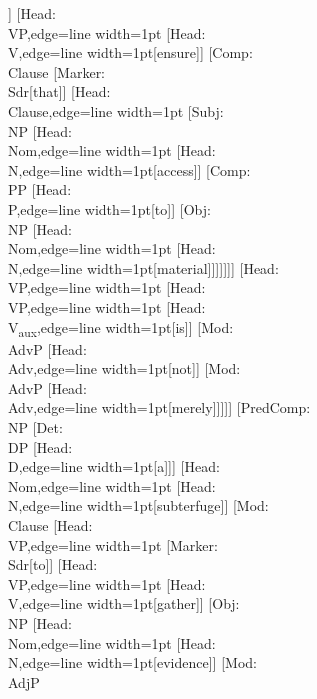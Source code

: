\documentclass[tikz,border=12pt]{standalone}
\newcommand{\Node}[2]{\small\textsf{#1:}\\{#2}}
\begin{document}
\begin{forest}
                    [\Node{Marker}{Sdr}[to]]
                    [\Node{Head}{VP},edge={line width=1pt}
                        [\Node{Head}{V},edge={line width=1pt}[ensure]]
                        [\Node{Comp}{Clause}
                            [\Node{Marker}{Sdr}[that]]
                            [\Node{Head}{Clause},edge={line width=1pt}
                                [\Node{Subj}{NP}
                                    [\Node{Head}{Nom},edge={line width=1pt}
                                        [\Node{Head}{N},edge={line width=1pt}[access]]
                                        [\Node{Comp}{PP}
                                            [\Node{Head}{P},edge={line width=1pt}[to]]
                                            [\Node{Obj}{NP}
                                                [\Node{Head}{Nom},edge={line width=1pt}
                                                    [\Node{Head}{N},edge={line width=1pt}[material]]]]]]]
                                [\Node{Head}{VP},edge={line width=1pt}
                                    [\Node{Head}{VP},edge={line width=1pt}
                                        [\Node{Head}{V\textsubscript{aux}},edge={line width=1pt}[is]]
                                        [\Node{Mod}{AdvP}
                                            [\Node{Head}{Adv},edge={line width=1pt}[not]]
                                            [\Node{Mod}{AdvP}
                                                [\Node{Head}{Adv},edge={line width=1pt}[merely]]]]]
                                    [\Node{PredComp}{NP}
                                        [\Node{Det}{DP}
                                            [\Node{Head}{D},edge={line width=1pt}[a]]]
                                        [\Node{Head}{Nom},edge={line width=1pt}
                                            [\Node{Head}{N},edge={line width=1pt}[subterfuge]]
                                            [\Node{Mod}{Clause}
                                                [\Node{Head}{VP},edge={line width=1pt}
                                                    [\Node{Marker}{Sdr}[to]]
                                                    [\Node{Head}{VP},edge={line width=1pt}
                                                        [\Node{Head}{V},edge={line width=1pt}[gather]]
                                                        [\Node{Obj}{NP}
                                                            [\Node{Head}{Nom},edge={line width=1pt}
                                                                [\Node{Head}{N},edge={line width=1pt}[evidence]]
                                                                [\Node{Mod}{AdjP}

\end{forest}
\end{document}
